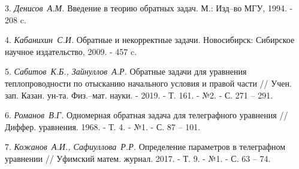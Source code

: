 3. {\it Денисов~А.М.} Введение в теорию обратных задач. М.: Изд--во МГУ, 1994. - 208 c.

4. {\it Кабанихин~С.И.} Обратные и некорректные задачи. Новосибирск: Сибирское научное
 издательство, 2009. - 457 c.

5. {\it Сабитов~К.Б., Зайнуллов~А.Р.} Обратные задачи для уравнения теплопроводности по отысканию
 начального условия и правой части // Учен. зап. Казан. ун-та. Физ.--мат. науки. - 2019. - Т. 161. - №2. - С. 271 -- 291.

6. {\it Романов~В.Г.} Одномерная обратная задача для телеграфного уравнения // Диффер. уравнения.
 1968. - Т. 4. - №1. - С. 87 -- 101.

7. {\it Кожанов~А.И., Сафиуллова~Р.Р.} Определение параметров в телеграфном уравнении // Уфимский
 матем. журнал. 2017. - Т. 9. - №1. - С. 63 -- 74.
